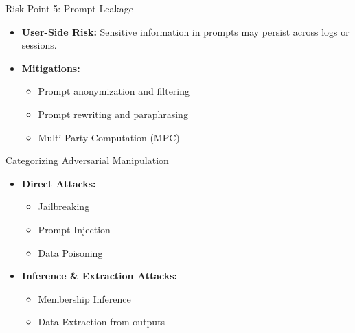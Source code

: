 \documentclass[aspectratio=169,xcolor=dvipsnames]{beamer}
\begin{document}
	\begin{frame}{Risk Point 5: Prompt Leakage}
		
		\begin{itemize}
			\item \textbf{User-Side Risk:} Sensitive information in prompts may persist across logs or sessions.
			
			\item \textbf{Mitigations:}
			\begin{itemize}
				\item Prompt anonymization and filtering
				\item Prompt rewriting and paraphrasing
				\item Multi-Party Computation (MPC)
			\end{itemize}
		\end{itemize}
		
	\end{frame}
	
	\begin{frame}{Categorizing Adversarial Manipulation}
		
		\begin{itemize}
			\item \textbf{Direct Attacks:}
			\begin{itemize}
				\item Jailbreaking
				\item Prompt Injection
				\item Data Poisoning
			\end{itemize}
			
			\item \textbf{Inference \& Extraction Attacks:}
			\begin{itemize}
				\item Membership Inference
				\item Data Extraction from outputs
			\end{itemize}
		\end{itemize}
		
	\end{frame}
	
\end{document}
